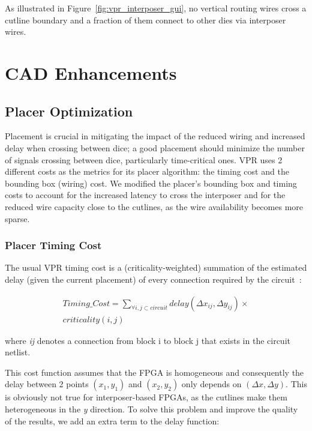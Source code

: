 \documentclass[journal]{IEEEtran}
\begin{document}
As illustrated in Figure~\ref{fig:vpr_interposer_gui}, no vertical routing wires cross a cutline boundary and a fraction of them connect to other dies via interposer wires.


\section{CAD Enhancements}
\label{cadSection}

\subsection{Placer Optimization}
\label{cad_enh_placer_subsection}
Placement is crucial in mitigating the impact of the reduced wiring and increased delay when crossing between dice; a good placement should minimize the number of signals crossing between dice, particularly time-critical ones. VPR uses 2 different costs as the metrics for its placer algorithm: the timing cost and the bounding box (wiring) cost. We modified the placer's bounding box and timing costs to account for the increased latency to cross the interposer and for the reduced wire capacity close to the cutlines, as the wire availability becomes more sparse.

\subsubsection{Placer Timing Cost}
The usual VPR timing cost is a (criticality-weighted) summation of the estimated delay (given the current placement) of every connection required by the circuit~\cite{timing2000}:

 
\setlength{\arraycolsep}{0.0em}
\begin{multline}
\label{eq:timing_eq_full}
Timing\_Cost=\sum_{\forall i, j \subset circuit} delay(\Delta x_{ij},\Delta y_{ij}) \times \\ 
criticality(i,j)
\end{multline}
\setlength{\arraycolsep}{5pt}

where \textit{ij} denotes a connection from block i to block j that exists in the circuit netlist.

This cost function assumes that the FPGA is homogeneous and consequently the delay between 2 points $(x_1,y_1)$ and $(x_2,y_2)$ only depends on $(\Delta x,\Delta y)$. This is obviously not true for interposer-based FPGAs, as the cutlines make them heterogeneous in the \textit{y} direction. To solve this problem and improve the quality of the results, we add an extra term to the delay function:
\end{document}

